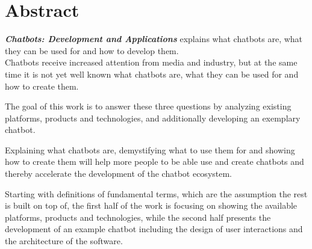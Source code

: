 \chapter*{Abstract}

\emph{\textbf{Chatbots: Development and Applications}} explains what chatbots are, what they can be used for and how to develop them.
\\

Chatbots receive increased attention from media and industry,
but at the same time it is not yet well known what chatbots are, what they can be used for and how to create them.

The goal of this work is to answer these three questions by analyzing existing platforms, products and technologies,
and additionally developing an exemplary chatbot.

Explaining what chatbots are, demystifying what to use them for and showing how to create them
will help more people to be able use and create chatbots and thereby accelerate the development of the chatbot ecosystem.

Starting with definitions of fundamental terms, which are the assumption the rest is built on top of,
the first half of the work is focusing on showing the available platforms, products and technologies,
while the second half presents the development of an example chatbot including the design of user interactions and the architecture of the software.
